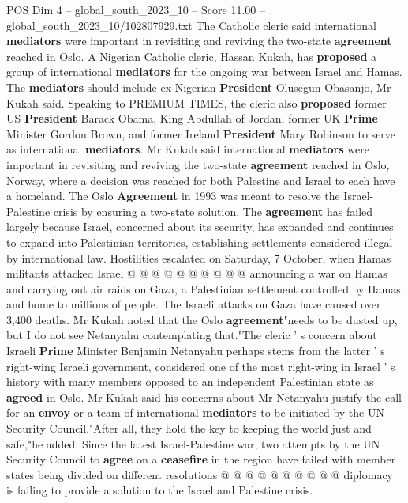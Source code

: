 \begin{textsample}{POS Dim 4 – global\_south\_2023\_10 – Score 11.00 – global\_south\_2023\_10/102807929.txt}  \label{ex:f4_pos_439}
The Catholic cleric said international \textbf{mediators} were important in revisiting and reviving the two-state \textbf{agreement} reached in Oslo.
A Nigerian Catholic cleric, Hassan Kukah, has \textbf{proposed} a group of international \textbf{mediators} for the ongoing war between Israel and Hamas.
The \textbf{mediators} should include ex-Nigerian \textbf{President} Olusegun Obasanjo, Mr Kukah said.
Speaking to PREMIUM TIMES, the cleric also \textbf{proposed} former US \textbf{President} Barack Obama, King Abdullah of Jordan, former UK \textbf{Prime} Minister Gordon Brown, and former Ireland \textbf{President} Mary Robinson to serve as international \textbf{mediators}.
Mr Kukah said international \textbf{mediators} were important in revisiting and reviving the two-state \textbf{agreement} reached in Oslo, Norway, where a decision was reached for both Palestine and Israel to each have a homeland.
The Oslo \textbf{Agreement} in 1993 was meant to resolve the Israel-Palestine crisis by ensuring a two-state solution.
The \textbf{agreement} has failed largely because Israel, concerned about its security, has expanded and continues to expand into Palestinian territories, establishing settlements considered illegal by international law.
Hostilities escalated on Saturday, 7 October, when Hamas militants attacked Israel @ @ @ @ @ @ @ @ @ @ announcing a war on Hamas and carrying out air raids on Gaza, a Palestinian settlement controlled by Hamas and home to millions of people.
The Israeli attacks on Gaza have caused over 3,400 deaths.
Mr Kukah noted that the Oslo \textbf{agreement}"needs to be dusted up, but I do not see Netanyahu contemplating that."The cleric ' s concern about Israeli \textbf{Prime} Minister Benjamin Netanyahu perhaps stems from the latter ' s right-wing Israeli government, considered one of the most right-wing in Israel ' s history with many members opposed to an independent Palestinian state as \textbf{agreed} in Oslo.
Mr Kukah said his concerns about Mr Netanyahu justify the call for an \textbf{envoy} or a team of international \textbf{mediators} to be initiated by the UN Security Council."After all, they hold the key to keeping the world just and safe,"he added.
Since the latest Israel-Palestine war, two attempts by the UN Security Council to \textbf{agree} on a \textbf{ceasefire} in the region have failed with member states being divided on different resolutions @ @ @ @ @ @ @ @ @ @ diplomacy is failing to provide a solution to the Israel and Palestine crisis.

\end{textsample}

